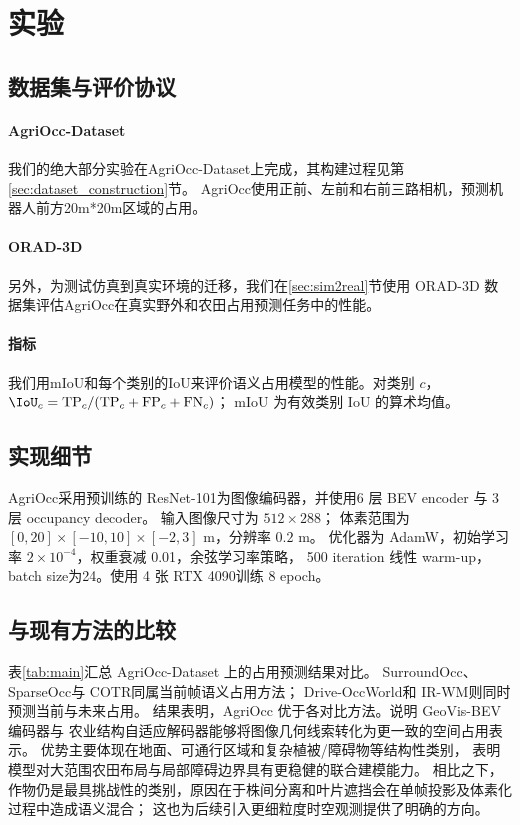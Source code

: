 \section{实验}\label{sec:experiments}

\subsection{数据集与评价协议}\label{sec:data}
\paragraph{AgriOcc-Dataset}
我们的绝大部分实验在AgriOcc-Dataset上完成，其构建过程见第\ref{sec:dataset_construction}节。
AgriOcc使用正前、左前和右前三路相机，预测机器人前方20m*20m区域的占用。

\paragraph{ORAD-3D}
另外，为测试仿真到真实环境的迁移，我们在\ref{sec:sim2real}节使用 ORAD-3D 数据集\cite{chen2025orad3d}评估AgriOcc在真实野外和农田占用预测任务中的性能。

\paragraph{指标}
我们用mIoU和每个类别的IoU来评价语义占用模型的性能。对类别 $c$，$\IoU_c=\mathrm{TP}_c/(\mathrm{TP}_c+\mathrm{FP}_c+\mathrm{FN}_c)$；
mIoU 为有效类别 IoU 的算术均值。

\subsection{实现细节}\label{sec:implementation}
AgriOcc采用预训练的 ResNet-101为图像编码器，并使用6 层 BEV encoder 与 3 层 occupancy decoder。
输入图像尺寸为 $512\times288$；
体素范围为 $[0,20]\times[-10,10]\times[-2,3]$ m，分辨率 $0.2$ m。
优化器为 AdamW，初始学习率 $2\times10^{-4}$，权重衰减 0.01，余弦学习率策略，
500 iteration 线性 warm-up，batch size为24。使用 4 张 RTX 4090训练 8 epoch。

\subsection{与现有方法的比较}\label{sec:comparison}
表\ref{tab:main}汇总 AgriOcc-Dataset 上的占用预测结果对比。
SurroundOcc\cite{wei2023surroundocc}、SparseOcc\cite{tang2024sparseocc}与 COTR\cite{ma2024cotr}同属当前帧语义占用方法；
Drive-OccWorld\cite{yangDrivingOccupancyWorld2025}和 IR-WM\cite{meiVisionCentric4DOccupancy2026}则同时预测当前与未来占用。
结果表明，AgriOcc 优于各对比方法。说明 GeoVis-BEV 编码器与
农业结构自适应解码器能够将图像几何线索转化为更一致的空间占用表示。
优势主要体现在地面、可通行区域和复杂植被/障碍物等结构性类别，
表明模型对大范围农田布局与局部障碍边界具有更稳健的联合建模能力。
相比之下，作物仍是最具挑战性的类别，原因在于株间分离和叶片遮挡会在单帧投影及体素化过程中造成语义混合；
这也为后续引入更细粒度时空观测提供了明确的方向。

